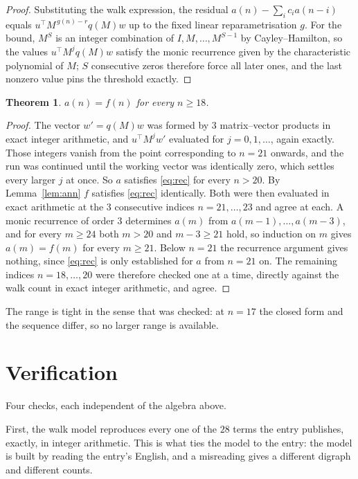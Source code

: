 \documentclass[11pt,a4paper]{article}
\theoremstyle{plain}
\newtheorem{theorem}{Theorem}
\theoremstyle{definition}
\begin{document}
\begin{proof}
Substituting the walk expression, the residual $a(n)-\sum_ic_ia(n-i)$ equals
$u^{\!\top}M^{\,g(n)-r}q(M)w$ up to the fixed linear reparametrisation $g$. For the bound,
$M^{S}$ is an integer combination of $I,M,\dots,M^{S-1}$ by Cayley--Hamilton, so the values
$u^{\!\top}M^{j}q(M)w$ satisfy the monic recurrence given by the characteristic polynomial of
$M$; $S$ consecutive zeros therefore force all later ones, and the last nonzero value pins the
threshold exactly.
\end{proof}

\begin{theorem}
$a(n)=f(n)$ for every $n\ge18$.
\end{theorem}

\begin{proof}
The vector $w'=q(M)w$ was formed by $3$ matrix--vector products in exact integer
arithmetic, and $u^{\!\top}M^{j}w'$ evaluated for $j=0,1,\dots$, again exactly. Those integers
vanish from the point corresponding to $n=21$ onwards, and the run was continued until the
working vector was identically zero, which settles every larger $j$ at once. So $a$ satisfies
\eqref{eq:rec} for every $n>20$. By Lemma~\ref{lem:ann} $f$ satisfies \eqref{eq:rec}
identically. Both were then evaluated in exact arithmetic at the $3$ consecutive indices
$n=21,\dots,23$ and agree at each. A monic recurrence of order $3$
determines $a(m)$ from $a(m-1),\dots,a(m-3)$, and for every $m\ge24$ both
$m>20$ and $m-3\ge21$ hold, so induction on $m$ gives $a(m)=f(m)$ for every
$m\ge21$.
Below $n=21$ the recurrence argument gives nothing, since \eqref{eq:rec} is only
established for $a$ from $n=21$ on. The remaining indices $n=18,\dots,20$ were
therefore checked one at a time, directly against the walk count in exact integer arithmetic,
and agree.
\end{proof}

The range is tight in the sense that was checked: at $n=17$ the closed form and the sequence differ, so no larger range is available.

\section{Verification}

Four checks, each independent of the algebra above.

First, the walk model reproduces every one of the $28$ terms the entry publishes,
exactly, in integer arithmetic. This is what ties the model to the entry: the model is built
by reading the entry's English, and a misreading gives a different digraph and different
counts.
\end{document}
